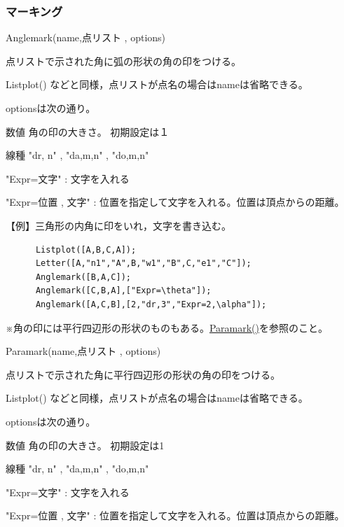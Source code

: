 \documentclass[papersize,a4paper,12pt,uplatex]{jsarticle}
\begin{document}
\subsubsection{マーキング}
\begin{description}

\hypertarget{anglemark}{}
\item[関数]  Anglemark(name,点リスト , options)
\item[機能]  点リストで示された角に弧の形状の角の印をつける。
\item[説明]  Listplot() などと同様，点リストが点名の場合はnameは省略できる。

optionsは次の通り。

数値      角の印の大きさ。 初期設定は１

線種      "dr, n"  , "da,m,n" , "do,m,n"

"Expr=文字"  : 文字を入れる

"Expr=位置 , 文字"  : 位置を指定して文字を入れる。位置は頂点からの距離。

\vspace{\baselineskip}
【例】三角形の内角に印をいれ，文字を書き込む。
\begin{verbatim}
      Listplot([A,B,C,A]);
      Letter([A,"n1","A",B,"w1","B",C,"e1","C"]);
      Anglemark([B,A,C]);
      Anglemark([C,B,A],["Expr=\theta"]);
      Anglemark([A,C,B],[2,"dr,3","Expr=2,\alpha"]);
\end{verbatim}

\hspace{20mm}

※角の印には平行四辺形の形状のものもある。\hyperlink{paramark}{Paramark()}を参照のこと。

\vspace{\baselineskip}
\hypertarget{paramark}{}
\item[関数]  Paramark(name,点リスト , options)
\item[機能]  点リストで示された角に平行四辺形の形状の角の印をつける。
\item[説明]  Listplot() などと同様，点リストが点名の場合はnameは省略できる。

optionsは次の通り。

数値  角の印の大きさ。 初期設定は1

線種  "dr, n"  , "da,m,n" , "do,m,n"

"Expr=文字"  : 文字を入れる

"Expr=位置 , 文字"  : 位置を指定して文字を入れる。位置は頂点からの距離。


\end{description}
\end{document}
